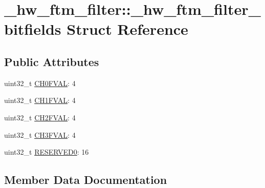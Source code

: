 \hypertarget{struct__hw__ftm__filter_1_1__hw__ftm__filter__bitfields}{}\section{\+\_\+hw\+\_\+ftm\+\_\+filter\+:\+:\+\_\+hw\+\_\+ftm\+\_\+filter\+\_\+bitfields Struct Reference}
\label{struct__hw__ftm__filter_1_1__hw__ftm__filter__bitfields}
\subsection*{Public Attributes}
\begin{DoxyCompactItemize}
\item 
uint32\+\_\+t \hyperlink{struct__hw__ftm__filter_1_1__hw__ftm__filter__bitfields_a09d4c1ff55e88b9bc25b3c90882be66b}{C\+H0\+F\+V\+AL}\+: 4
\item 
uint32\+\_\+t \hyperlink{struct__hw__ftm__filter_1_1__hw__ftm__filter__bitfields_af121284e814195afedf54636144e0240}{C\+H1\+F\+V\+AL}\+: 4
\item 
uint32\+\_\+t \hyperlink{struct__hw__ftm__filter_1_1__hw__ftm__filter__bitfields_ae6d0aea148f6828291bf5f3573907131}{C\+H2\+F\+V\+AL}\+: 4
\item 
uint32\+\_\+t \hyperlink{struct__hw__ftm__filter_1_1__hw__ftm__filter__bitfields_a79fa7480881c915bbac33194cc05620d}{C\+H3\+F\+V\+AL}\+: 4
\item 
uint32\+\_\+t \hyperlink{struct__hw__ftm__filter_1_1__hw__ftm__filter__bitfields_a7301508d7bc934b91346f6df87dd9da0}{R\+E\+S\+E\+R\+V\+E\+D0}\+: 16
\end{DoxyCompactItemize}


\subsection{Member Data Documentation}
